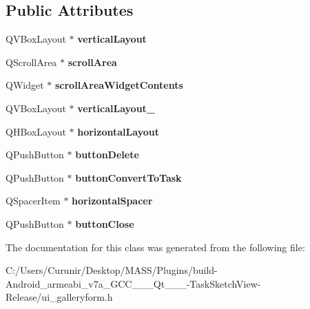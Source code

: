 \subsection*{Public Attributes}
\begin{DoxyCompactItemize}
\item 
\mbox{\label{class_ui___gallery_form_a6ac0c502209b6ea729863b272c5987cb}} 
Q\+V\+Box\+Layout $\ast$ {\bfseries vertical\+Layout}
\item 
\mbox{\label{class_ui___gallery_form_a4f584e9b404fbdd67c9f04bba8200dfd}} 
Q\+Scroll\+Area $\ast$ {\bfseries scroll\+Area}
\item 
\mbox{\label{class_ui___gallery_form_a93527569f2367c34315873d239d3c085}} 
Q\+Widget $\ast$ {\bfseries scroll\+Area\+Widget\+Contents}
\item 
\mbox{\label{class_ui___gallery_form_a137f0f4675091bd7ab8176f070dffc03}} 
Q\+V\+Box\+Layout $\ast$ {\bfseries vertical\+Layout\+\_}
\item 
\mbox{\label{class_ui___gallery_form_af1ca9449b9f74c0a840243749968bcdc}} 
Q\+H\+Box\+Layout $\ast$ {\bfseries horizontal\+Layout}
\item 
\mbox{\label{class_ui___gallery_form_a1576fbc1bc5159168eb78e60de0dfd2e}} 
Q\+Push\+Button $\ast$ {\bfseries button\+Delete}
\item 
\mbox{\label{class_ui___gallery_form_af8683544b5a8ce3c5b8ec8b425fa66ba}} 
Q\+Push\+Button $\ast$ {\bfseries button\+Convert\+To\+Task}
\item 
\mbox{\label{class_ui___gallery_form_ad0a0a5a1d7817bba06ed6333c65102e7}} 
Q\+Spacer\+Item $\ast$ {\bfseries horizontal\+Spacer}
\item 
\mbox{\label{class_ui___gallery_form_a1f72183617e8e4074e0a63fe229964d1}} 
Q\+Push\+Button $\ast$ {\bfseries button\+Close}
\end{DoxyCompactItemize}


The documentation for this class was generated from the following file\+:\begin{DoxyCompactItemize}
\item 
C\+:/\+Users/\+Curunir/\+Desktop/\+M\+A\+S\+S/\+Plugins/build-\/\+Android\+\_\+armeabi\+\_\+v7a\+\_\+\+G\+C\+C\+\_\+\_\+\_\+\+Qt\+\_\+\_\+\_-\/\+Task\+Sketch\+View-\/\+Release/ui\+\_\+galleryform.\+h\end{DoxyCompactItemize}
